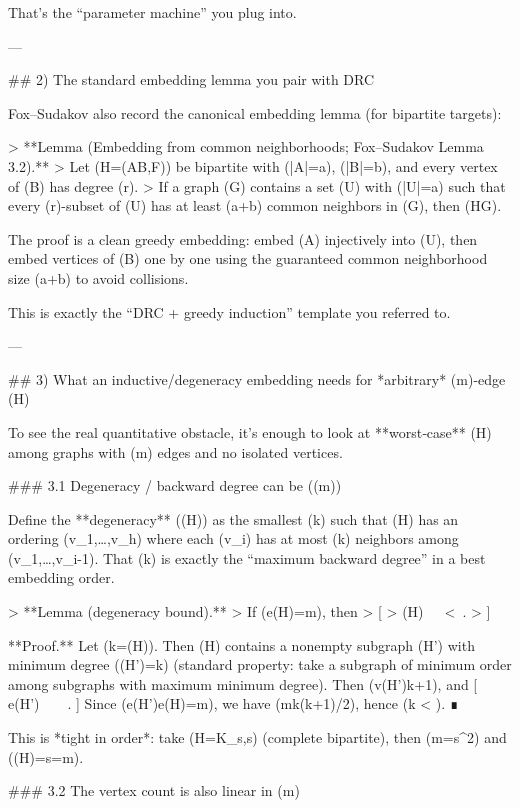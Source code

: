 That’s the “parameter machine” you plug into.

---

## 2) The standard embedding lemma you pair with DRC

Fox–Sudakov also record the canonical embedding lemma (for bipartite targets):

> **Lemma (Embedding from common neighborhoods; Fox–Sudakov Lemma 3.2).**
> Let (H=(A\cup B,F)) be bipartite with (|A|=a), (|B|=b), and every vertex of (B) has degree (\le r).
> If a graph (G) contains a set (U) with (|U|=a) such that every (r)-subset of (U) has at least (a+b) common neighbors in (G), then (H\subseteq G).

The proof is a clean greedy embedding: embed (A) injectively into (U), then embed vertices of (B) one by one using the guaranteed common neighborhood size (a+b) to avoid collisions.

This is exactly the “DRC + greedy induction” template you referred to.

---

## 3) What an inductive/degeneracy embedding needs for *arbitrary* (m)-edge (H)

To see the real quantitative obstacle, it’s enough to look at **worst‑case** (H) among graphs with (m) edges and no isolated vertices.

### 3.1 Degeneracy / backward degree can be (\Theta(\sqrt m))

Define the **degeneracy** ((H)) as the smallest (k) such that (H) has an ordering (v_1,\dots,v_h) where each (v_i) has at most (k) neighbors among ({v_1,\dots,v_{i-1}}). That (k) is exactly the “maximum backward degree” in a best embedding order.

> **Lemma (degeneracy bound).**
> If (e(H)=m), then
> [
> (H)\ \le\ \left\lfloor{}\right\rfloor\ <\ .
> ]

**Proof.** Let (k=(H)). Then (H) contains a nonempty subgraph (H') with minimum degree (\delta(H')=k) (standard property: take a subgraph of minimum order among subgraphs with maximum minimum degree). Then (v(H')\ge k+1), and
[
e(H')\ \ge\ \ \ge\ .
]
Since (e(H')\le e(H)=m), we have (m\ge k(k+1)/2), hence (k < ). ∎

This is *tight in order*: take (H=K_{s,s}) (complete bipartite), then (m=s^2) and ((H)=s=\sqrt m).

### 3.2 The vertex count is also linear in (m)

